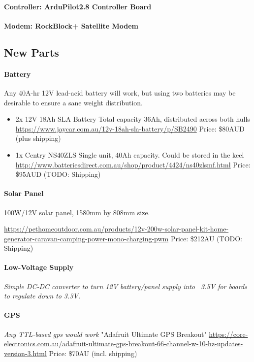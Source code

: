 \paragraph{Controller: ArduPilot2.8 Controller Board}

\paragraph{Modem: RockBlock+ Satellite Modem}

\subsection{New Parts}

\paragraph{Battery}
Any 40A-hr 12V lead-acid battery will work, but using two batteries may be desirable to ensure a sane weight distribution.

\begin{itemize}
\item{2x 12V 18Ah SLA Battery} 
Total capacity 36Ah, distributed across both hulls
\url{https://www.jaycar.com.au/12v-18ah-sla-battery/p/SB2490}
Price: \$80AUD (plus shipping)

\item{1x Centry NS40ZLS}
Single unit, 40Ah capacity. Could be stored in the keel 
\url{http://www.batteriesdirect.com.au/shop/product/4424/ns40zlsmf.html}
Price: \$95AUD (TODO: Shipping)
\end{itemize}

\paragraph{Solar Panel}
100W/12V solar panel, 1580mm by 808mm size. 

\url{https://pethomeoutdoor.com.au/products/12v-200w-solar-panel-kit-home-generator-caravan-camping-power-mono-charging-pwm}
Price: \$212AU (TODO: Shipping)

\paragraph{Low-Voltage Supply}
\emph{Simple DC-DC converter to turn 12V battery/panel supply into ~3.5V for boards to regulate down to 3.3V.}

\paragraph{GPS}
\emph{Any TTL-based gps would work}
"Adafruit Ultimate GPS Breakout"
\url{https://core-electronics.com.au/adafruit-ultimate-gps-breakout-66-channel-w-10-hz-updates-version-3.html}
Price: \$70AU (incl. shipping)

